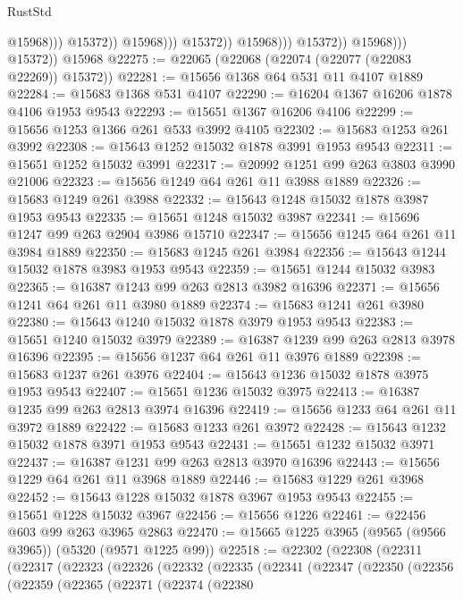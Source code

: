 \begin{lexlean}{RustStd}
\begin{coremodule}
                                            @15968)))
                                      @15372))
                                  @15968)))
                            @15372))
                        @15968)))
                  @15372))
              @15968)))
        @15372))
    @15968
@22275 := @22065 (@22068 (@22074 (@22077 (@22083 @22269)) @15372))
@22281 := @15656 @1368 @64 @531 @11 @4107 @1889
@22284 := @15683 @1368 @531 @4107
@22290 := @16204 @1367 @16206 @1878 @4106 @1953 @9543
@22293 := @15651 @1367 @16206 @4106
@22299 := @15656 @1253 @1366 @261 @533 @3992 @4105
@22302 := @15683 @1253 @261 @3992
@22308 := @15643 @1252 @15032 @1878 @3991 @1953 @9543
@22311 := @15651 @1252 @15032 @3991
@22317 := @20992 @1251 @99 @263 @3803 @3990 @21006
@22323 := @15656 @1249 @64 @261 @11 @3988 @1889
@22326 := @15683 @1249 @261 @3988
@22332 := @15643 @1248 @15032 @1878 @3987 @1953 @9543
@22335 := @15651 @1248 @15032 @3987
@22341 := @15696 @1247 @99 @263 @2904 @3986 @15710
@22347 := @15656 @1245 @64 @261 @11 @3984 @1889
@22350 := @15683 @1245 @261 @3984
@22356 := @15643 @1244 @15032 @1878 @3983 @1953 @9543
@22359 := @15651 @1244 @15032 @3983
@22365 := @16387 @1243 @99 @263 @2813 @3982 @16396
@22371 := @15656 @1241 @64 @261 @11 @3980 @1889
@22374 := @15683 @1241 @261 @3980
@22380 := @15643 @1240 @15032 @1878 @3979 @1953 @9543
@22383 := @15651 @1240 @15032 @3979
@22389 := @16387 @1239 @99 @263 @2813 @3978 @16396
@22395 := @15656 @1237 @64 @261 @11 @3976 @1889
@22398 := @15683 @1237 @261 @3976
@22404 := @15643 @1236 @15032 @1878 @3975 @1953 @9543
@22407 := @15651 @1236 @15032 @3975
@22413 := @16387 @1235 @99 @263 @2813 @3974 @16396
@22419 := @15656 @1233 @64 @261 @11 @3972 @1889
@22422 := @15683 @1233 @261 @3972
@22428 := @15643 @1232 @15032 @1878 @3971 @1953 @9543
@22431 := @15651 @1232 @15032 @3971
@22437 := @16387 @1231 @99 @263 @2813 @3970 @16396
@22443 := @15656 @1229 @64 @261 @11 @3968 @1889
@22446 := @15683 @1229 @261 @3968
@22452 := @15643 @1228 @15032 @1878 @3967 @1953 @9543
@22455 := @15651 @1228 @15032 @3967
@22456 := @15656 @1226
@22461 := @22456 @603 @99 @263 @3965 @2863
@22470 := @15665 @1225 @3965 (@9565 (@9566 @3965)) (@5320 (@9571 @1225 @99))
@22518 := @22302
    (@22308
      (@22311
        (@22317
          (@22323
            (@22326
              (@22332
                (@22335
                  (@22341
                    (@22347
                      (@22350
                        (@22356
                          (@22359
                            (@22365
                              (@22371
                                (@22374
                                  (@22380

\end{coremodule}
\end{lexlean}
